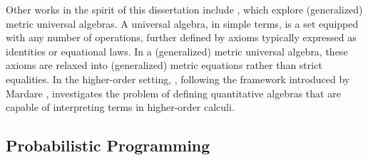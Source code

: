 Other works in the spirit of this dissertation include \cite{mardare2016quantitative, mardare2017axiomatizability, mio24, jurka24}, which explore (generalized) metric universal algebras. A universal algebra, in simple terms, is a set equipped with any number of operations, further defined  by axioms typically expressed as identities or equational laws. In a (generalized) metric universal algebra, these axioms are relaxed into (generalized) metric equations rather than strict equalities. In the higher-order setting, \cite{lago22}, following the framework introduced by Mardare \cite{mardare2016quantitative}, investigates the problem of defining quantitative algebras that are capable of interpreting terms in higher-order calculi.



\begin{comment}
Remarkably a number of important results already considered additive structure
in the quantalic setting, even if sometimes implicitly.
References~\cite{mardare2016quantitative,mardare2017axiomatizability,mio24,jurka24}
for example are framed in the setting of universal algebra and therefore
involve additive conjunction (\ie\ $\&$), typically interpreted via categorical
products.  In the higher-order setting, \cite{lago22} enforces additive
conjunction to be left adjoint to implication (interpreted via
Cartesian-closedness), with a series of negative results emerging from this.
Our work is orthogonal to these in that we study the dual of $\&$ (\ie\
$\oplus$) and furthermore we assume the left adjoint of implication to be
multiplicative conjunction (\ie\ $\otimes$) instead of the additive
counterpart. Among other things, this removes the obstacles discussed
in~\cite{lago22}.
\end{comment}



\subsection*{Probabilistic Programming}


